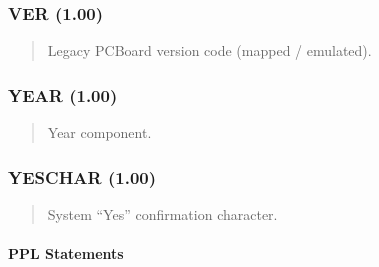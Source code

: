 \documentclass[letterpaper,10pt,english]{sphinxmanual}
\begin{document}
\subsubsection{VER (1.00)}
\label{\detokenize{ppl:ver-1-00}}\begin{quote}

\sphinxAtStartPar
{}
\begin{description}
\sphinxAtStartPar
Legacy PCBoard version code (mapped / emulated).

\end{description}
\end{quote}


\subsubsection{YEAR (1.00)}
\label{\detokenize{ppl:year-1-00}}\begin{quote}

\sphinxAtStartPar
{}
\begin{description}
\sphinxAtStartPar
Year component.

\end{description}
\end{quote}


\subsubsection{YESCHAR (1.00)}
\label{\detokenize{ppl:yeschar-1-00}}\begin{quote}

\sphinxAtStartPar
{}
\begin{description}
\sphinxAtStartPar
System “Yes” confirmation character.

\end{description}
\end{quote}


\paragraph{PPL Statements}
\label{\detokenize{ppl:ppl-statements}}
\end{document}
